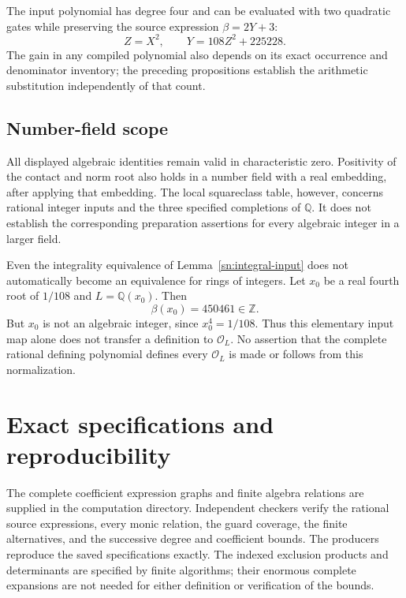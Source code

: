 \documentclass[11pt,a4paper]{article}
\theoremstyle{definition}
\theoremstyle{remark}
\begin{document}
The input polynomial has degree four and can be evaluated with
two quadratic gates while preserving the source expression
$\beta=2Y+3$:
\[
                    Z=X^2,\qquad Y=108Z^2+225228.
\]
The gain in any compiled polynomial also depends on its exact
occurrence and denominator inventory; the preceding propositions
establish the arithmetic substitution independently of that count.

\subsection{Number-field scope}

All displayed algebraic identities remain valid in characteristic
zero.  Positivity of the contact and norm root also holds in a
number field with a real embedding, after applying that embedding.
The local squareclass table, however, concerns rational integer
inputs and the three specified completions of $\mathbb Q$.
It does not establish the corresponding preparation assertions
for every algebraic integer in a larger field.

Even the integrality equivalence of Lemma~\ref{sn:integral-input}
does not automatically become an equivalence for rings of
integers.  Let $x_0$ be a real fourth root of $1/108$ and
$L=\mathbb Q(x_0)$.  Then
\[
                       \beta(x_0)=450461\in\mathbb Z.
\]
But $x_0$ is not an algebraic integer, since $x_0^4=1/108$.
Thus this elementary input map
alone does not transfer a definition to $\mathcal O_L$.
No assertion that the complete rational defining polynomial
defines every $\mathcal O_L$ is made or follows from this
normalization.


\section{Exact specifications and reproducibility}
The complete coefficient expression graphs and finite algebra relations
are supplied in the computation directory. Independent checkers verify
the rational source expressions, every monic relation, the guard
coverage, the finite alternatives, and the successive degree and
coefficient bounds. The producers reproduce the saved specifications
exactly. The indexed exclusion products and determinants are specified
by finite algorithms; their enormous complete expansions are not
needed for either definition or verification of the bounds.
\end{document}
